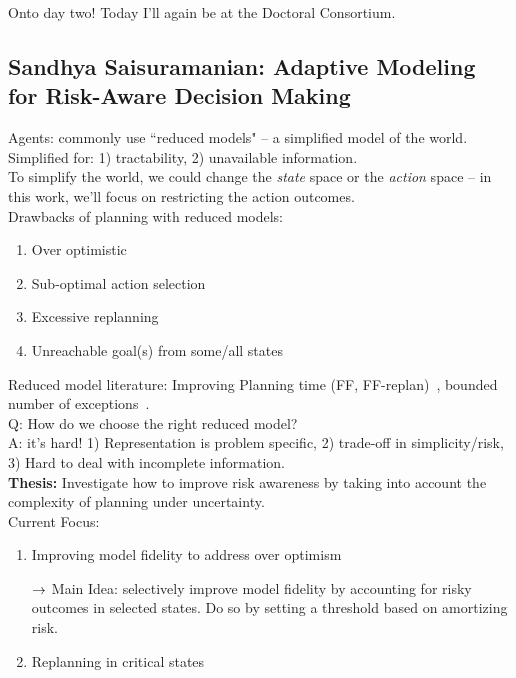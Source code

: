 Onto day two! Today I'll again be at the Doctoral Consortium.


\subsection{Sandhya Saisuramanian: Adaptive Modeling for Risk-Aware Decision Making}

Agents: commonly use ``reduced models" -- a simplified model of the world. \\

Simplified for: 1) tractability, 2) unavailable information. \\

To simplify the world, we could change the {\it state} space or the {\it action} space -- in this work, we'll focus on restricting the action outcomes. \\

Drawbacks of planning with reduced models:
\begin{enumerate}
    \item Over optimistic
    \item Sub-optimal action selection
    \item Excessive replanning
    \item Unreachable goal(s) from some/all states
\end{enumerate}

Reduced model literature: Improving Planning time (FF, FF-replan)~\cite{yoon2007ff}, bounded number of exceptions~\cite{pineda2014planning}. \\

Q: How do we choose the right reduced model? \\

A: it's hard! 1) Representation is problem specific, 2) trade-off in simplicity/risk, 3) Hard to deal with incomplete information. \\

{\bf Thesis:} Investigate how to improve risk awareness by taking into account the complexity of planning under uncertainty. \\

Current Focus:
\begin{enumerate}
    \item Improving model fidelity to address over optimism
    
    $\rightarrow$ Main Idea: selectively improve model fidelity by accounting for risky outcomes in selected states. Do so by setting a threshold based on amortizing risk.
    
    \item Replanning in critical states
\end{enumerate}


